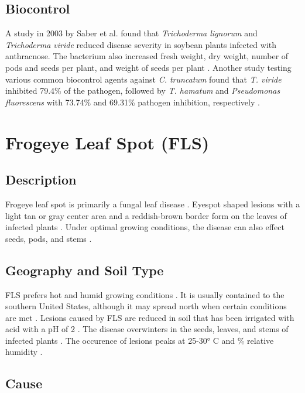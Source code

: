 \documentclass[letterpaper, 12pt]{report}
\begin{document}
\subsection{Biocontrol}

A study in 2003 by Saber et al. found that \emph{Trichoderma lignorum} and \emph{Trichoderma viride} reduced disease severity in soybean plants infected with anthracnose. The bacterium also increased fresh weight, dry weight, number of pods and seeds per plant, and weight of seeds per plant \autocite{saber2003biocontrol}. Another study testing various common biocontrol agents against \emph{C. truncatum} found that \emph{T. viride} inhibited 79.4\% of the pathogen, followed by \emph{T. hamatum} and \emph{Pseudomonas fluorescens} with 73.74\% and 69.31\% pathogen inhibition, respectively \autocite{jagtap2012control}.


\section[Frogeye Leaf Spot]{Frogeye Leaf Spot (FLS)}

\subsection{Description}

Frogeye leaf spot is primarily a fungal leaf disease \autocite{dunleavy1966soybean}. Eyespot shaped lesions with a light tan or gray center area and a reddish-brown border form on the leaves of infected plants \autocite{dunleavy1966soybean}. Under optimal growing conditions, the disease can also effect seeds, pods, and stems \autocite{mian2008frogeye}.

\subsection{Geography and Soil Type}

FLS prefers hot and humid growing conditions \autocite{mian2008frogeye}. It is usually contained to the southern United States, although it may spread north when certain conditions are met \autocite{dunleavy1966soybean}. Lesions caused by FLS are reduced in soil that has been irrigated with acid with a pH of 2 \autocite{walker1994effects}. The disease overwinters in the seeds, leaves, and stems of infected plants \autocite{dunleavy1966soybean}. The occurence of lesions peaks at 25-30° C and \% relative humidity \autocite{mian2008frogeye}.

\subsection{Cause}
\end{document}
